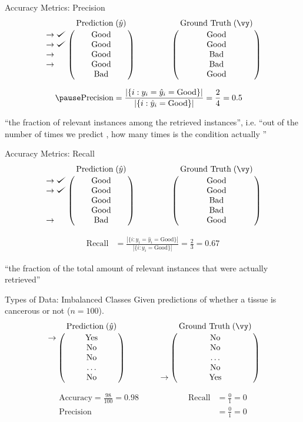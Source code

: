 \documentclass[usenames,dvipsnames]{beamer}
\begin{document}
\begin{frame}{Accuracy Metrics: Precision}
$$
\bordermatrix{&\text{Prediction}\;(\hat{y})\cr
               \rightarrow\checkmark&\text{Good}\cr
               \rightarrow\checkmark&\text{Good}\cr
                \rightarrow&\text{Good}\cr
                \rightarrow&\text{Good}\cr
               &\text{Bad}}
\qquad \qquad
\bordermatrix{&\text{Ground Truth}\;(\vy)\cr
                &\text{Good}\cr
                &\text{Good}\cr
                &\text{Bad}\cr
                &\text{Bad}\cr
                &\text{Good}}
$$

\begin{align*}
\pause \text{Precision} &= \frac{|\{i : y_i = \hat{y}_i = \text{Good}\}|}{|\{i : \hat{y}_i = \text{Good}\}|} = \frac{2}{4} = 0.5
\end{align*}

``the fraction of relevant instances among the retrieved instances'', i.e. ``out of the number of times we predict , how many times is the condition actually ''

\end{frame}

\begin{frame}{Accuracy Metrics: Recall}
$$
\bordermatrix{&\text{Prediction}\;(\hat{y})\cr
               \rightarrow\checkmark&\text{Good}\cr
               \rightarrow\checkmark&\text{Good}\cr
                &\text{Good}\cr
                &\text{Good}\cr
               \rightarrow&\text{Bad}}
\qquad \qquad
\bordermatrix{&\text{Ground Truth}\;(\vy)\cr
                &\text{Good}\cr
                &\text{Good}\cr
                &\text{Bad}\cr
                &\text{Bad}\cr
                &\text{Good}}
$$

\begin{align*}
\text{Recall} &= \frac{|\{i : y_i = \hat{y}_i = \text{Good}\}|}{|\{i : y_i = \text{Good}\}|} = \frac{2}{3} = 0.67
\end{align*}

``the fraction of the total amount of relevant instances that were actually retrieved''

\end{frame}

\begin{frame}{Types of Data: Imbalanced Classes}
Given predictions of whether a tissue is cancerous or not ($n = 100$).
$$
\bordermatrix{&\text{Prediction}\;(\hat{y})\cr
               \rightarrow&\text{Yes}\cr
               &\text{No}\cr
                &\text{No}\cr
                &\ldots\cr
               &\text{No}}
\qquad \qquad
\bordermatrix{&\text{Ground Truth}\;(\vy)\cr
                &\text{No}\cr
                &\text{No}\cr
                &\ldots\cr
                &\text{No}\cr
                \rightarrow&\text{Yes}}
            $$

\pause 
\begin{align*}
\text{Accuracy} = \frac{98}{100} = 0.98 \qquad \qquad \qquad
\text{Recall} &= \frac{0}{1} = 0 \\
\text{Precision} &= \frac{0}{1} = 0
\end{align*}


\end{frame}
\end{document}
